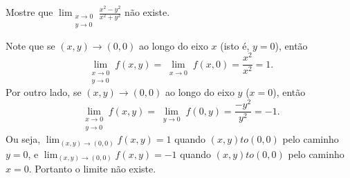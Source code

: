 \begin{example}
    Mostre que \(\displaystyle\lim_{\substack{x\to 0 \\ y\to 0}} \frac{x^2 - y^2}{x^2+y^2}\) não existe.

    Note que se \((x,y) \to (0,0)\) ao longo do eixo \(x\) (isto é, \(y=0\)), então \[\displaystyle\lim_{\substack{x\to 0 \\ y\to 0}} f(x,y) = \displaystyle\lim_{\substack{x\to 0}} f(x,0) = \frac{x^2}{x^2} = 1.\] Por outro lado, se \((x,y) \to (0,0)\) ao longo do eixo \(y\) (\(x=0\)), então \[\displaystyle\lim_{\substack{x\to 0 \\ y\to 0}} f(x,y) = \displaystyle\lim_{\substack{y\to 0}} f(0,y) = \frac{-y^2}{y^2} = -1.\] Ou seja, \(\lim_{(x,y)\to(0,0)} f(x,y) = 1\) quando \((x,y) to (0,0)\) pelo caminho \(y=0\), e \(\lim_{(x,y)\to(0,0)} f(x,y) = -1\) quando \((x,y) to (0,0)\) pelo caminho \(x=0\). Portanto o limite não existe.
\end{example}

